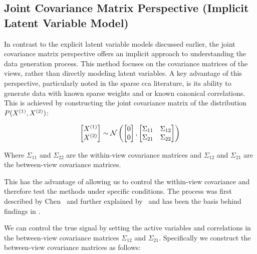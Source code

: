 \subsection{Joint Covariance Matrix Perspective (Implicit Latent Variable Model)}

In contrast to the explicit latent variable models discussed earlier, the joint covariance matrix perspective \cite{suo2017sparse,chen2013sparse} offers an implicit approach to understanding the data generation process.
This method focuses on the covariance matrices of the views, rather than directly modeling latent variables.
A key advantage of this perspective, particularly noted in the sparse \acrshort{cca} literature, is its ability to generate data with known sparse weights and or known canonical correlations.
This is achieved by constructing the joint covariance matrix of the distribution $P(X^{(1)},X^{(2)})$:

\begin{align}
    \label{eq:covariance}
    \begin{bmatrix}
        X^{(1)} \\ X^{(2)}
    \end{bmatrix} \sim \mathcal{N} \left( \begin{bmatrix}
                                              0 \\ 0
    \end{bmatrix}, \begin{bmatrix}
                       \Sigma_{11} & \Sigma_{12} \\ \Sigma_{21} & \Sigma_{22}
    \end{bmatrix} \right)
\end{align}

Where $\Sigma_{11}$ and $\Sigma_{22}$ are the within-view covariance matrices and $\Sigma_{12}$ and $\Sigma_{21}$ are the between-view covariance matrices.

This has the advantage of allowing us to control the within-view covariance and therefore test the methods under specific conditions.
The process was first described by Chen~\citep{chen2013sparse} and further explained by~\citep{suo2017sparse} and has been the basis behind findings in \citet{helmer2020stability,matkovivc2023static}.

We can control the true signal by setting the active variables and correlations in the between-view covariance matrices $\Sigma_{12}$ and $\Sigma_{21}$.
Specifically we construct the between-view covariance matrices as follows:

